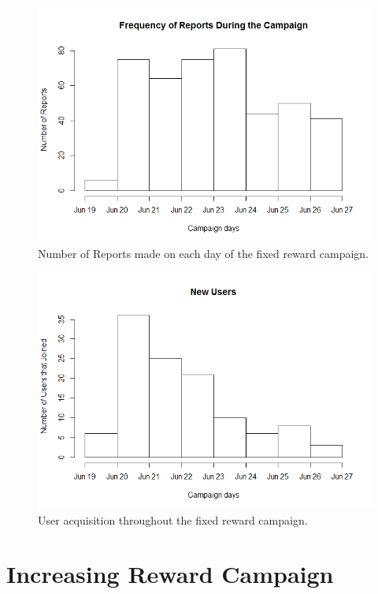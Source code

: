 \documentclass[letterpaper]{article}
\begin{document}
\begin{figure}[htb]
	\begin{center}
		\includegraphics[width=1\linewidth]{images/RPerDay_F}
		\caption{Number of Reports made on each day of the fixed reward campaign.\label{fig:freqreportsperday1}}
	\end{center}
\end{figure}

\begin{figure}[htb]
	\begin{center}
		\includegraphics[width=1\linewidth]{images/NewUsers_F}
		\caption{User acquisition throughout the fixed reward campaign.\label{fig:newusers1}}
	\end{center}
\end{figure}

\section{Increasing Reward Campaign}
\end{document}
